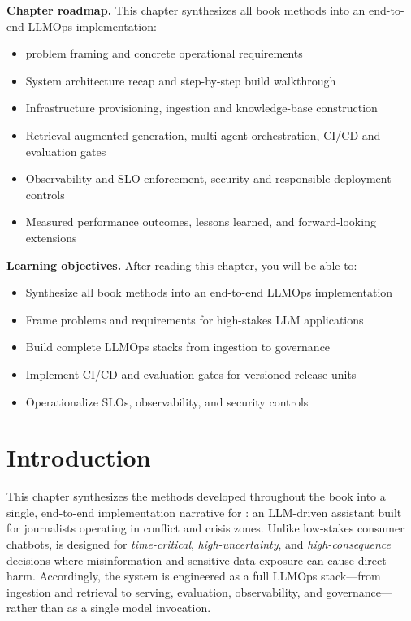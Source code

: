 \begin{tcolorbox}[
  title={\textbf{Chapter Overview}},
  colback=blue!5,
  colframe=blue!40!black,
  colbacktitle=blue!20,
  coltitle=black,
  fonttitle=\bfseries,
  boxrule=0.7pt,
  arc=4pt,
  left=5mm, right=5mm, top=4mm, bottom=4mm
]
\noindent\textbf{Chapter roadmap.}
This chapter synthesizes all book methods into an end-to-end LLMOps implementation:
\begin{itemize}[leftmargin=1.5em, itemsep=3pt]
    \item \ishtar{} problem framing and concrete operational requirements
    \item System architecture recap and step-by-step build walkthrough
    \item Infrastructure provisioning, ingestion and knowledge-base construction
    \item Retrieval-augmented generation, multi-agent orchestration, CI/CD and evaluation gates
    \item Observability and SLO enforcement, security and responsible-deployment controls
    \item Measured performance outcomes, lessons learned, and forward-looking extensions
\end{itemize}

\medskip
\noindent\textbf{Learning objectives.} After reading this chapter, you will be able to:
\begin{itemize}[leftmargin=1.5em, itemsep=3pt]
    \item Synthesize all book methods into an end-to-end LLMOps implementation
    \item Frame problems and requirements for high-stakes LLM applications
    \item Build complete LLMOps stacks from ingestion to governance
    \item Implement CI/CD and evaluation gates for versioned release units
    \item Operationalize SLOs, observability, and security controls
\end{itemize}
\end{tcolorbox}


\section{Introduction}
\label{sec:ch12-introduction}
This chapter synthesizes the methods developed throughout the book into a single, end-to-end implementation narrative for \ishtar{}: an LLM-driven assistant built for journalists operating in conflict and crisis zones.
Unlike low-stakes consumer chatbots, \ishtar{} is designed for \emph{time-critical}, \emph{high-uncertainty}, and \emph{high-consequence} decisions where misinformation and sensitive-data exposure can cause direct harm.
Accordingly, the system is engineered as a full LLMOps stack---from ingestion and retrieval to serving, evaluation, observability, and governance---rather than as a single model invocation.

